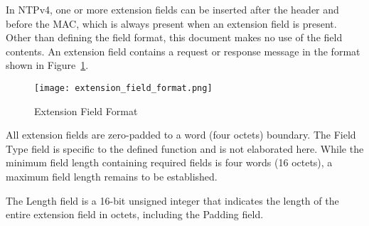 In NTPv4, one or more extension fields can be inserted after the
header and before the MAC, which is always present when an extension
field is present. Other than defining the field format, this
document makes no use of the field contents. An extension field
contains a request or response message in the format shown in
Figure~\ref{extension_field_format}.

\begin{figure}
\centering
\texttt{[image: extension\_field\_format.png]}
\caption{Extension Field Format}
\label{extension_field_format}
\end{figure}

All extension fields are zero-padded to a word (four octets)
boundary. The Field Type field is specific to the defined function
and is not elaborated here. While the minimum field length
containing required fields is four words (16 octets), a maximum field
length remains to be established.

The Length field is a 16-bit unsigned integer that indicates the
length of the entire extension field in octets, including the Padding
field.
